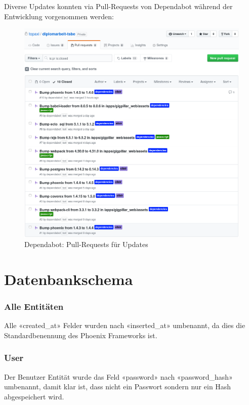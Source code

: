 \clearpage
Diverse Updates konnten via Pull-Requests von Dependabot während der Entwicklung
vorgenommen werden:

\begin{figure}[!htb]
  \centering
  \includegraphics[width=1\textwidth]{realisierung/dependabot-updates-cropped.png}
  \caption{Dependabot: Pull-Requests für Updates}
\end{figure}

\clearpage
\section{Datenbankschema}

\subsubsection{Alle Entitäten}
Alle «created\_at» Felder wurden nach «inserted\_at» umbenannt, da dies die
Standardbenennung des Phoenix Frameworks ist.

\subsubsection{User}
Der Benutzer Entität wurde das Feld «password» nach «password\_hash» umbenannt,
damit klar ist, dass nicht ein Passwort sondern nur ein Hash abgespeichert wird.

